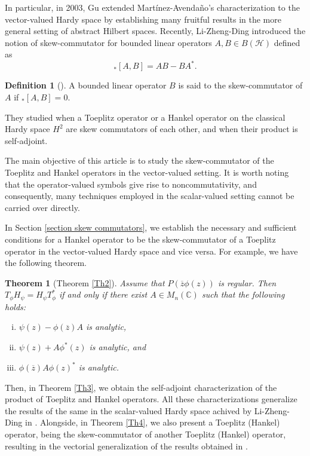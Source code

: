 \documentclass[12pt, reqno]{amsart}
\newtheorem*{theorem*}{Theorem}
\theoremstyle{definition}
\newtheorem{definition}[theorem]{Definition}
\theoremstyle{remark}
\numberwithin{equation}{section}
\begin{document}
   In particular, in 2003, Gu \cite{CG} extended Mart\'inez-Avenda\~no's characterization to the vector-valued Hardy space by establishing many fruitful results in the more general setting of abstract Hilbert spaces. 
   Recently, Li-Zheng-Ding \cite{LZD} introduced the notion of skew-commutator for bounded linear operators $A, B \in B(\mathcal{H})$ defined as
   $$_*[A, B]= AB- BA^*.$$
    \begin{definition}[\cite{LZD}]
        A bounded linear operator $B$ is said to the skew-commutator of $A$ if $ _*[A, B]=0.$
    \end{definition}
    They studied when a Toeplitz operator or a Hankel operator on the classical Hardy space $H^2$ are skew commutators of each other, and when their product is self-adjoint.

   The main objective of this article is to study the skew-commutator of the Toeplitz and Hankel operators in the vector-valued setting. It is worth noting that the operator-valued symbols give rise to noncommutativity, and consequently, many techniques employed in the scalar-valued setting cannot be carried over directly.
   
   In Section \ref{section skew commutators}, we establish the necessary and sufficient conditions for a Hankel operator to be the skew-commutator of a Toeplitz operator in the vector-valued Hardy space and vice versa. 
   For example, we have the following theorem.
   \begin{theorem*}[Theorem \ref{Th2}]
        Assume that $P(\overline z \phi(z))$ is regular. Then $T_\phi H_\psi =H_\psi T_\phi^*$  if and only if there exist $A\in M_n(\mathbb{C})$ such that the following holds:
        \begin{enumerate}[(i)]
            \item $\psi(z)-\phi ( \overline z)A$ is analytic,
            \item $\psi(z)+A\phi^*(z)$ is analytic, and
            \item $\phi(\overline z)A\phi(z)^*$ is analytic.
       \end{enumerate}
    \end{theorem*}
   Then, in Theorem \ref{Th3}, we obtain the self-adjoint characterization of the product of Toeplitz and Hankel operators. All these characterizations generalize the results of the same in the scalar-valued Hardy space achived by Li-Zheng-Ding in \cite{LZD}. 
   Alongside, in Theorem \ref{Th4},
   we also present a Toeplitz (Hankel) operator, being the skew-commutator of another Toeplitz (Hankel) operator, resulting in the vectorial generalization of the results obtained in \cite{LD}.
\end{document}
